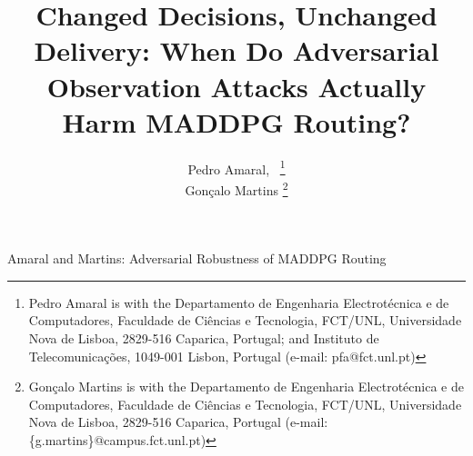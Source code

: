 \documentclass[10pt,journal,comsoc]{IEEEtran}
\begin{document}
\title{Changed Decisions, Unchanged Delivery: When Do Adversarial Observation
Attacks Actually Harm MADDPG Routing?}

\author{
  Pedro Amaral,~%
  \thanks{Pedro Amaral is with the Departamento de Engenharia Electrot\'ecnica e de Computadores, Faculdade de Ci\^encias e Tecnologia, FCT/UNL, Universidade Nova de Lisboa, 2829-516 Caparica, Portugal; and Instituto de Telecomunica\c{c}\~oes, 1049-001 Lisbon, Portugal (e-mail: pfa@fct.unl.pt)}%
  \\
  Gonçalo Martins%
  \thanks{Gonçalo Martins is with the Departamento de Engenharia Electrot\'ecnica e de Computadores, Faculdade de Ci\^encias e Tecnologia, FCT/UNL, Universidade Nova de Lisboa, 2829-516 Caparica, Portugal (e-mail: \{g.martins\}@campus.fct.unl.pt)}
}

%
{Amaral and Martins: Adversarial Robustness of MADDPG Routing}

\maketitle
\end{document}
